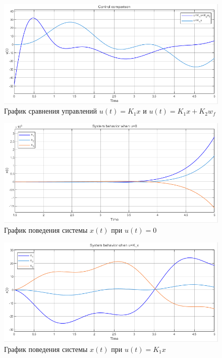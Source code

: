 \documentclass[a4paper, 12pt]{article}
\begin{document}
    \begin{figure}[H]
        \centering
        \includegraphics[scale=0.75]{1task_uu.png}
        \captionsetup{skip=0pt}
        \caption{График сравнения управлений $u(t)=K_1x$ и $u(t)=K_1x+K_2 w_f$}
        \label{fig:1task_uu}
    \end{figure}
    \begin{figure}[H]
        \centering
        \includegraphics[scale=0.75]{1task_unull_x.png}
        \captionsetup{skip=0pt}
        \caption{График поведения системы $x(t)$ при $u(t)=0$}
        \label{fig:1task_unull_x}
    \end{figure}
    \begin{figure}[H]
        \centering
        \includegraphics[scale=0.75]{1task_uk_x.png}
        \captionsetup{skip=0pt}
        \caption{График поведения системы $x(t)$ при $u(t)=K_1x$}
        \label{fig:1task_uk_x}
    \end{figure}
\end{document}
